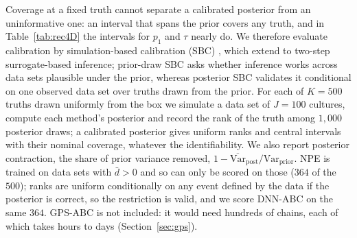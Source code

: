 \documentclass[sn-basic,iicol,pdflatex]{sn-jnl}
\begin{document}
Coverage at a fixed truth cannot separate a calibrated posterior from an uninformative one: an
interval that spans the prior covers any truth, and in Table~\ref{tab:rec4D} the intervals for $p_1$
and $\tau$ nearly do. We therefore evaluate calibration by simulation-based calibration (SBC) \citep{cook2006,talts2018,modrak2025}, which \citet{reiser2025} extend to two-step surrogate-based inference; prior-draw SBC asks whether inference works across data sets plausible under the prior, whereas posterior SBC \citep{sailynoja2026} validates it conditional on one observed data set
over truths drawn from the prior. For each of $K=500$ truths drawn uniformly from the box we simulate a data set of
$J=100$ cultures, compute each method's posterior and record the rank of the truth among $1{,}000$ posterior
draws; a calibrated posterior gives uniform ranks and central intervals with their nominal coverage,
whatever the identifiability. We also report posterior contraction, the share of prior
variance removed, $1-\overline{\mathrm{Var}}_{\mathrm{post}}/\mathrm{Var}_{\mathrm{prior}}$.
NPE is trained on data sets with $\bar d>0$ and so can only be scored on those ($364$ of the $500$);
ranks are uniform conditionally on any event defined by the data if the posterior is correct, so the
restriction is valid, and we score DNN-ABC on the same $364$. GPS-ABC is not included: it would need
hundreds of chains, each of which takes hours to days (Section~\ref{sec:gps}).

\begin{table}[!t]
\centering
\caption{Simulation-based calibration over $500$ prior draws ($364$ with $\bar d>0$; binomial s.e.\ of a coverage
near $0.95$ is $0.011$). Coverage is of central $50$, $90$ and $95\%$ intervals; the rank $p$-value is of a
$\chi^2$ test of uniformity on ten bins (a graphical alternative is the empirical-CDF (ECDF) difference test of \citealp{sailynoja2022}); contraction is the share of prior variance removed.}
\label{tab:sbc4D}
\small

\end{table}
\end{document}
